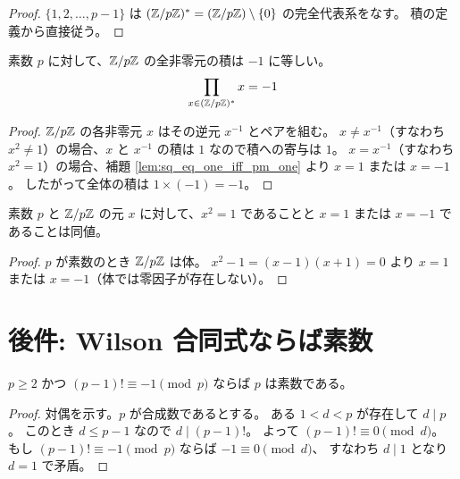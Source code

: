 \begin{proof}

$\{1, 2, \ldots, p-1\}$ は $(\mathbb{Z}/p\mathbb{Z})^* = (\mathbb{Z}/p\mathbb{Z}) \setminus \{0\}$ の完全代表系をなす。
積の定義から直接従う。
\end{proof}

\begin{lemma}
\label{lem:prod_nonzero_eq_neg_one}
素数 $p$ に対して、$\mathbb{Z}/p\mathbb{Z}$ の全非零元の積は $-1$ に等しい。
\[
  \prod_{x \in (\mathbb{Z}/p\mathbb{Z})^*} x = -1
\]

\end{lemma}

\begin{proof}

$\mathbb{Z}/p\mathbb{Z}$ の各非零元 $x$ はその逆元 $x^{-1}$ とペアを組む。
$x \neq x^{-1}$（すなわち $x^2 \neq 1$）の場合、$x$ と $x^{-1}$ の積は $1$ なので積への寄与は $1$。
$x = x^{-1}$（すなわち $x^2 = 1$）の場合、補題 \ref{lem:sq_eq_one_iff_pm_one} より
$x = 1$ または $x = -1$。
したがって全体の積は $1 \times (-1) = -1$。
\end{proof}

\begin{lemma}
\label{lem:sq_eq_one_iff_pm_one}
\uses{}
素数 $p$ と $\mathbb{Z}/p\mathbb{Z}$ の元 $x$ に対して、$x^2 = 1$ であることと
$x = 1$ または $x = -1$ であることは同値。

\end{lemma}

\begin{proof}

$p$ が素数のとき $\mathbb{Z}/p\mathbb{Z}$ は体。
$x^2 - 1 = (x-1)(x+1) = 0$ より $x = 1$ または $x = -1$（体では零因子が存在しない）。
\end{proof}

\section{後件: Wilson 合同式ならば素数}

\begin{theorem}
\label{thm:prime_of_factorial}
\uses{}
$p \geq 2$ かつ $(p-1)! \equiv -1 \pmod{p}$ ならば $p$ は素数である。

\end{theorem}

\begin{proof}

対偶を示す。$p$ が合成数であるとする。
ある $1 < d < p$ が存在して $d \mid p$。
このとき $d \leq p - 1$ なので $d \mid (p-1)!$。
よって $(p-1)! \equiv 0 \pmod{d}$。
もし $(p-1)! \equiv -1 \pmod{p}$ ならば $-1 \equiv 0 \pmod{d}$、
すなわち $d \mid 1$ となり $d = 1$ で矛盾。
\end{proof}

